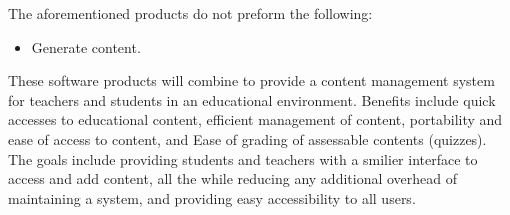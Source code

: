 \documentclass[]{article}
\begin{document}
\noindent The aforementioned products do not preform the following:
\begin{itemize}
  \item Generate content.
\end{itemize}

\noindent These software products will combine to provide a content management system for
teachers and students in an educational environment. Benefits include quick
accesses to educational content, efficient management of content, portability
and ease of access to content, and Ease of grading of assessable contents
(quizzes). The goals include providing students and teachers with a smilier
interface to access and add content, all the while reducing any additional
overhead of maintaining a system, and providing easy accessibility to all
users.
\end{document}
